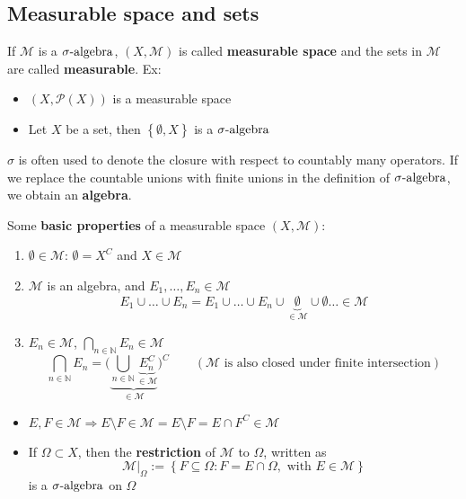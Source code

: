 \subsection{Measurable space and sets}
If \(\mathcal{M}\) is a \(\sigma\mbox{-algebra}\), \((X, \mathcal{M})\) is called \textbf{measurable space} and the sets in \(\mathcal{M}\) are called \textbf{measurable}.  
Ex: \begin{itemize}
    \item \((X, \mathcal{P}(X))\) is a measurable space
    \item Let \(X\) be a set, then \(\left\lbrace \emptyset, X \right\rbrace\) is a \(\sigma\mbox{-algebra}\)
\end{itemize}
\begin{remark}
    \(\sigma\) is often used to denote the closure with respect to countably many operators. If we replace the countable unions with finite unions in the definition of \(\sigma\mbox{-algebra}\), we obtain an \textbf{algebra}.
\end{remark}
Some \textbf{basic properties} of a measurable space \((X, \mathcal{M})\):
\begin{enumerate}
    \item \(\emptyset \in \mathcal{M}\): \(\emptyset = X^C\) and \(X \in \mathcal{M}\)
    \item \(\mathcal{M}\) is an algebra, and \(E_1, \ldots, E_n \in \mathcal{M}\)
    \[
        E_1 \cup \ldots \cup E_n = E_1 \cup \ldots \cup E_n \cup \underbrace{\emptyset}_{\in \mathcal{M}} \cup \emptyset \ldots \in \mathcal{M} 
    \]
    \item \(E_n \in \mathcal{M}\), \(\bigcap_{n \in \mathbb{N}} E_n \in \mathcal{M}\)
    \[
        \bigcap_{n \in \mathbb{N}} E_n = \biggl(\underbrace{\bigcup_{n \in \mathbb{N}} \underbrace{E_n^C}_{\in \mathcal{M}}}_{\in \mathcal{M}}\biggr)^C \qquad (\mathcal{M} \mbox{ is also closed under finite intersection})
    \]
    \end{enumerate}
\begin{itemize}
    \item \(E, F \in \mathcal{M} \Rightarrow E \setminus F \in \mathcal{M} = E \setminus F = E \cap F^C \in \mathcal{M}\)
    \item If \(\Omega \subset X\), then the \textbf{restriction} of \(\mathcal{M}\) to \(\Omega\), written as \[\mathcal{M}\vert_{\Omega} := \left\lbrace F \subseteq \Omega: F = E \cap \Omega, \mbox{ with } E \in \mathcal{M} \right\rbrace\] is a \(\sigma\mbox{-algebra}\) on \(\Omega\)
\end{itemize}
